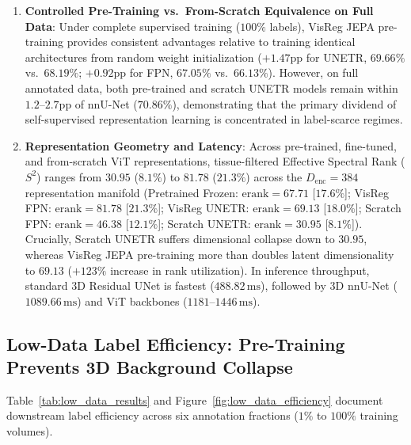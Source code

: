 \documentclass{article}
\begin{document}
\begin{enumerate}
    \item \textbf{Controlled Pre-Training vs.\ From-Scratch Equivalence on Full Data}: Under complete supervised training ($100\%$ labels), VisReg JEPA pre-training provides consistent advantages relative to training identical architectures from random weight initialization ($+1.47\text{pp}$ for UNETR, $69.66\%$ vs.\ $68.19\%$; $+0.92\text{pp}$ for FPN, $67.05\%$ vs.\ $66.13\%$). However, on full annotated data, both pre-trained and scratch UNETR models remain within $1.2\text{--}2.7\text{pp}$ of nnU-Net ($70.86\%$), demonstrating that the primary dividend of self-supervised representation learning is concentrated in label-scarce regimes.
    \item \textbf{Representation Geometry and Latency}: Across pre-trained, fine-tuned, and from-scratch ViT representations, tissue-filtered Effective Spectral Rank ($S^2$) ranges from $30.95$ ($8.1\%$) to $81.78$ ($21.3\%$) across the $D_{\text{enc}} = 384$ representation manifold (Pretrained Frozen: $\text{erank}=67.71$ [$17.6\%$]; VisReg FPN: $\text{erank}=81.78$ [$21.3\%$]; VisReg UNETR: $\text{erank}=69.13$ [$18.0\%$]; Scratch FPN: $\text{erank}=46.38$ [$12.1\%$]; Scratch UNETR: $\text{erank}=30.95$ [$8.1\%$]). Crucially, Scratch UNETR suffers dimensional collapse down to $30.95$, whereas VisReg JEPA pre-training more than doubles latent dimensionality to $69.13$ ($+123\%$ increase in rank utilization). In inference throughput, standard 3D Residual UNet is fastest ($488.82\,\text{ms}$), followed by 3D nnU-Net ($1089.66\,\text{ms}$) and ViT backbones ($1181\text{--}1446\,\text{ms}$).
\end{enumerate}

\subsection{Low-Data Label Efficiency: Pre-Training Prevents 3D Background Collapse}
\label{sec:results_low_data}

Table~\ref{tab:low_data_results} and Figure~\ref{fig:low_data_efficiency} document downstream label efficiency across six annotation fractions ($1\%$ to $100\%$ training volumes).
\end{document}
